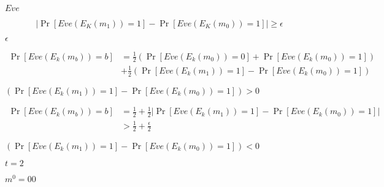 \documentclass[10pt]{book}
\begin{document}
\begin{mdSnippets}
\begin{mdInlineSnippet}%
$Eve$\end{mdInlineSnippet}%
\begin{mdDisplaySnippet}%
\[%
|\Pr[Eve(E_K(m_1)) = 1] - \Pr[Eve(E_K(m_0)) = 1]| \geq \epsilon
\]%
\end{mdDisplaySnippet}%
\begin{mdInlineSnippet}[92e4da341fe8f4cd46192f21b6ff3aa7]%
$\epsilon$\end{mdInlineSnippet}%
\begin{mdDisplaySnippet}%
\[%
\begin{aligned}
\Pr[Eve(E_k(m_b)) = b] &= \frac{1}{2} (\Pr[Eve(E_k(m_0)) = 0] + \Pr[Eve(E_k(m_0)) = 1]) \\
&+\frac{1}{2}(\Pr[Eve(E_k(m_1)) = 1] - \Pr[Eve(E_k(m_0)) = 1])
\end{aligned}
\]%
\end{mdDisplaySnippet}%
\begin{mdInlineSnippet}[65ba5e0889a4591133ec113b59f366f7]%
$(\Pr[Eve(E_k(m_1)) = 1] - \Pr[Eve(E_k(m_0)) = 1]) > 0$\end{mdInlineSnippet}%
\begin{mdDisplaySnippet}[944f0952a7259003307f6b254b48830d]%
\[%
\begin{aligned}
\Pr[Eve(E_k(m_b)) = b] &= \frac{1}{2} + \frac{1}{2}|\Pr[Eve(E_k(m_1)) = 1] - \Pr[Eve(E_k(m_0)) = 1]| \\
&> \frac{1}{2} + \frac{\epsilon}{2} 
\end{aligned}
\]%
\end{mdDisplaySnippet}%
\begin{mdInlineSnippet}[e0a1bd7b389e6796ec36892d797871ad]%
$(\Pr[Eve(E_k(m_1)) = 1] - \Pr[Eve(E_k(m_0)) = 1]) < 0$\end{mdInlineSnippet}%
\begin{mdInlineSnippet}[b0af76257fd334f5200fa9c2a421688a]%
$t=2$\end{mdInlineSnippet}%
\begin{mdInlineSnippet}[bb5422374817969af549253607d8f219]%
$m^0 = 00$\end{mdInlineSnippet}%

\end{mdSnippets}
\end{document}
